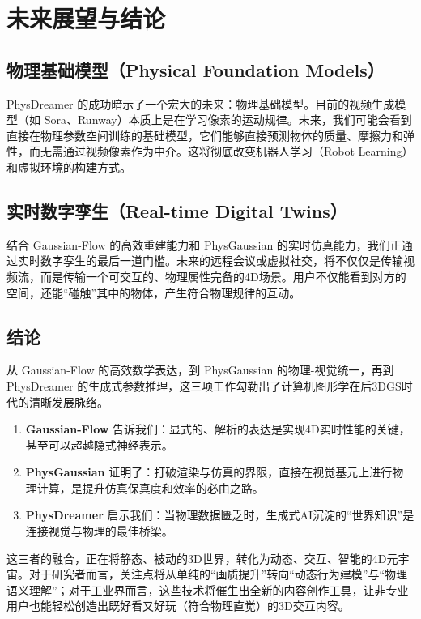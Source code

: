 
\chapter{未来展望与结论}
\label{cha:conclusion}

\section{物理基础模型（Physical Foundation Models）}
PhysDreamer 的成功暗示了一个宏大的未来：物理基础模型。目前的视频生成模型（如 Sora、Runway）本质上是在学习像素的运动规律。未来，我们可能会看到直接在物理参数空间训练的基础模型，它们能够直接预测物体的质量、摩擦力和弹性，而无需通过视频像素作为中介。这将彻底改变机器人学习（Robot Learning）和虚拟环境的构建方式。

\section{实时数字孪生（Real-time Digital Twins）}
结合 Gaussian-Flow 的高效重建能力和 PhysGaussian 的实时仿真能力，我们正通过实时数字孪生的最后一道门槛。未来的远程会议或虚拟社交，将不仅仅是传输视频流，而是传输一个可交互的、物理属性完备的4D场景。用户不仅能看到对方的空间，还能“碰触”其中的物体，产生符合物理规律的互动。

\section{结论}
从 Gaussian-Flow 的高效数学表达，到 PhysGaussian 的物理-视觉统一，再到 PhysDreamer 的生成式参数推理，这三项工作勾勒出了计算机图形学在后3DGS时代的清晰发展脉络。
\begin{enumerate}
\item \textbf{Gaussian-Flow} 告诉我们：显式的、解析的表达是实现4D实时性能的关键，甚至可以超越隐式神经表示\cite{lin2023gaussianflow_arxiv,lin2024gaussianflow_cvpr}。
\item \textbf{PhysGaussian} 证明了：打破渲染与仿真的界限，直接在视觉基元上进行物理计算，是提升仿真保真度和效率的必由之路\cite{xie2023physgaussian_arxiv,xie2024physgaussian_cvpr}。
\item \textbf{PhysDreamer} 启示我们：当物理数据匮乏时，生成式AI沉淀的“世界知识”是连接视觉与物理的最佳桥梁\cite{li2024physdreamer_arxiv,li2024physdreamer_eccv}。
\end{enumerate}
这三者的融合，正在将静态、被动的3D世界，转化为动态、交互、智能的4D元宇宙。对于研究者而言，关注点将从单纯的“画质提升”转向“动态行为建模”与“物理语义理解”；对于工业界而言，这些技术将催生出全新的内容创作工具，让非专业用户也能轻松创造出既好看又好玩（符合物理直觉）的3D交互内容。
